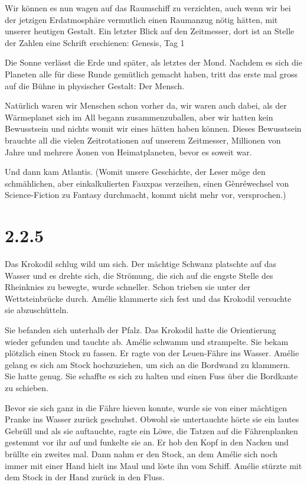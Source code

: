 \documentclass[11pt,titlepage,a5paper]{book}
\begin{document}
Wir können es nun wagen auf das Raumschiff zu verzichten, auch wenn wir bei der jetzigen Erdatmosphäre vermutlich einen Raumanzug nötig hätten, mit unserer heutigen Gestalt.
Ein letzter Blick auf den Zeitmesser, dort ist an Stelle der Zahlen eine Schrift erschienen: Genesis, Tag 1

Die Sonne verlässt die Erde und später, als letztes der Mond. Nachdem es sich die Planeten alle für diese Runde gemütlich gemacht haben, tritt das erste mal gross auf die Bühne in physischer Gestalt: Der Mensch.

Natürlich waren wir Menschen schon vorher da, wir waren auch dabei, als der Wärmeplanet sich im All begann zusammenzuballen, aber wir hatten kein Bewusstsein und nichts womit wir eines hätten haben können. Dieses Bewusstsein brauchte all die vielen Zeitrotationen auf unserem Zeitmesser, Millionen von Jahre und mehrere Äonen von Heimatplaneten, bevor es soweit war.

Und dann kam Atlantis. (Womit unsere Geschichte, der Leser möge den schmählichen, aber einkalkulierten Fauxpas verzeihen, einen Gènréwechsel von Science-Fiction zu Fantasy durchmacht, kommt nicht mehr vor, versprochen.)

\section*{2.2.5}

Das Krokodil schlug wild um sich. Der mächtige Schwanz platschte auf das Wasser und es drehte sich, die Strömung, die sich auf die engste Stelle des Rheinknies zu bewegte, wurde schneller. Schon trieben sie unter der Wettsteinbrücke durch. Amélie klammerte sich fest und das Krokodil versuchte sie abzuschütteln.

Sie befanden sich unterhalb der Pfalz. Das Krokodil hatte die Orientierung wieder gefunden und tauchte ab. Amélie schwamm und strampelte. Sie bekam plötzlich einen Stock zu fassen. Er ragte von der Leuen-Fähre ins Wasser. Amélie gelang es sich am Stock hochzuziehen, um sich an die Bordwand zu klammern. Sie hatte genug. Sie schaffte es sich zu halten und einen Fuss über die Bordkante zu schieben. 

Bevor sie sich ganz in die Fähre hieven konnte, wurde sie von einer mächtigen Pranke ins Wasser zurück geschubst. Obwohl sie untertauchte hörte sie ein lautes Gebrüll und als sie auftauchte, ragte ein Löwe, die Tatzen auf die Fährenplanken gestemmt vor ihr auf und funkelte sie an. Er hob den Kopf in den Nacken und brüllte ein zweites mal. Dann nahm er den Stock, an dem Amélie sich noch immer mit einer Hand hielt ins Maul und löste ihn vom Schiff. Amélie stürzte mit dem Stock in der Hand zurück in den Fluss.
\end{document}
